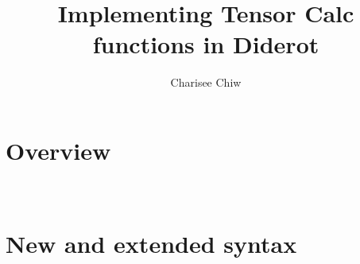 \documentclass{article}
\title{Implementing Tensor Calc functions in Diderot}
\author{Charisee Chiw}
\begin{document}
\maketitle 
\section{Overview}
\\

\section{New and extended syntax}






 
\end{document}
